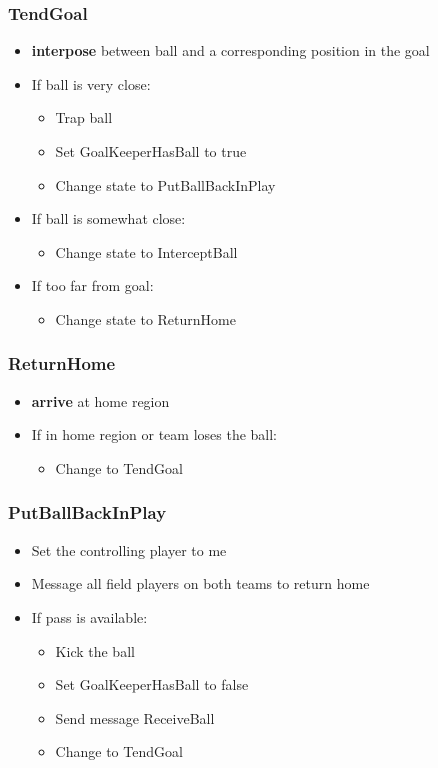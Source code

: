 \documentclass[handout,t,compress]{beamer}
\newcommand{\bframe}[1]{\begin{frame}[fragile]\frametitle{{#1}}}
\begin{document}
\bframe{TendGoal}
\begin{itemize}
\item {\bf interpose} between ball and a corresponding position in the goal
\item If ball is very close:
\begin{itemize}
\item Trap ball
\item Set GoalKeeperHasBall to true
\item Change state to PutBallBackInPlay
\end{itemize}
\item If ball is somewhat close:
\begin{itemize}
\item Change state to InterceptBall
\end{itemize}
\item If too far from goal:
\begin{itemize}
\item Change state to ReturnHome
\end{itemize}
\end{itemize}
\end{frame}

\bframe{ReturnHome}
\begin{itemize}
\item {\bf arrive} at home region
\item If in home region or team loses the ball:
\begin{itemize}
\item Change to TendGoal
\end{itemize}
\end{itemize}
\end{frame}

\bframe{PutBallBackInPlay}
\begin{itemize}
\item Set the controlling player to me
\item Message all field players on both teams to return home
\item If pass is available:
\begin{itemize}
\item Kick the ball
\item Set GoalKeeperHasBall to false
\item Send message ReceiveBall
\item Change to TendGoal
\end{itemize}
\end{itemize}
\end{frame}
\end{document}
